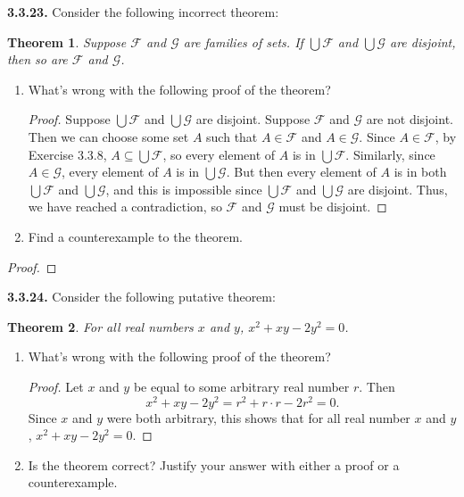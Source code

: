 \documentclass[12pt]{amsart}
\newenvironment{statement}[1]{\smallskip\noindent\color[rgb]{.6627, .3529, .6314} {\bf #1.}}{}
\newtheorem{theorem}{Theorem}
\theoremstyle{definition}
\theoremstyle{remark}
\begin{document}
\begin{statement}{3.3.23}
Consider the following incorrect theorem:
\begin{theorem}
	Suppose $\mathcal{F}$ and $\mathcal{G}$ are families of sets.
	If $\bigcup \mathcal{F}$ and $\bigcup \mathcal{G}$ are disjoint,
	then so are $\mathcal{F}$ and $\mathcal{G}$.
\end{theorem}
\begin{enumerate}
	\item What's wrong with the following proof of the theorem?
	\begin{proof}
		Suppose $\bigcup \mathcal{F}$ and $\bigcup \mathcal{G}$ are disjoint.
		Suppose $\mathcal{F}$ and $\mathcal{G}$ are not disjoint.
		Then we can choose some set $A$ such that $A \in \mathcal{F}$ and $A \in \mathcal{G}$.
		Since $A \in \mathcal{F}$, by Exercise 3.3.8, $A \subseteq \bigcup \mathcal{F}$,
		so every element of $A$ is in $\bigcup \mathcal{F}$.
		Similarly, since $A \in \mathcal{G}$, every element of $A$ is in $\bigcup \mathcal{G}$.
		But then every element of $A$ is in both $\bigcup \mathcal{F}$ and $\bigcup \mathcal{G}$,
		and this is impossible since $\bigcup \mathcal{F}$ and $\bigcup \mathcal{G}$ are disjoint.
		Thus, we have reached a contradiction, 
		so $\mathcal{F}$ and $\mathcal{G}$ must be disjoint.
	\end{proof}
	
	\item Find a counterexample to the theorem.
\end{enumerate}
\end{statement}

\begin{proof}
\end{proof}


\begin{statement}{3.3.24}
Consider the following putative theorem:
\begin{theorem}
	For all real numbers $x$ and $y$, $x^2 + xy - 2y^2 = 0$.
\end{theorem}
\begin{enumerate}
	\item What's wrong with the following proof of the theorem?
	\begin{proof}
		Let $x$ and $y$ be equal to some arbitrary real number $r$.
		Then
		\begin{equation*}
			x^2 + xy - 2y^2 = r^2 + r \cdot r - 2r^2 = 0.
		\end{equation*}
		Since $x$ and $y$ were both arbitrary, this shows that for all real number
		$x$ and $y$, $x^2 + xy - 2y^2 = 0$.
	\end{proof}
	
	\item Is the theorem correct?
	Justify your answer with either a proof or a counterexample.
\end{enumerate}
\end{statement}
\end{document}
